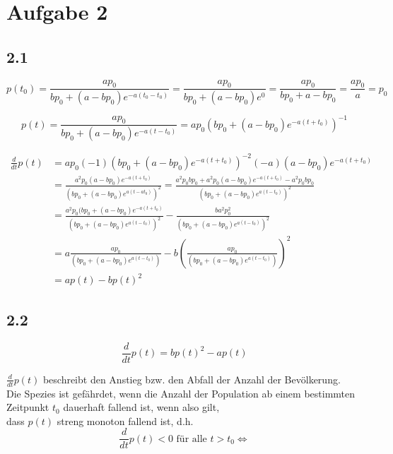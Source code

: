 \documentclass[10pt,oneside,a4paper]{scrartcl}
\begin{document}
	\section*{Aufgabe 2}

	\subsection*{2.1}

	\begin{equation*}	
		p(t_{0}) =\frac {ap_0} {bp_0+ (a-bp_0)e^{-a(t_{0}-t_0)} } = 
				\frac {ap_0} {bp_0+ (a-bp_0)e^0 } = 
				\frac {ap_0} {bp_0+ a-bp_0} =
				\frac {ap_0} {a } = p_0 
	\end{equation*}

	\begin{equation*}
		p(t)  =\frac {ap_0} {bp_0+ (a-bp_0)e^{-a(t-t_0)} } =
			 ap_{0} (bp_0+ (a-bp_0)e^{-a(t + t_0) })^{-1} 
	\end{equation*}

	\begin{align*}
		\frac{d}{dt}p(t) & =
			 ap_{0}(-1) (bp_0+( a -bp_0)e^{-a(t + t_0) })^{-2}
			 (- a)(a-bp_0)e^{-a(t + t_0) }\\
			 & =\frac {a^{2}p_0(a-bp_0)e^{-a(t + t_0)}} {(bp_0+( a -bp_0)e^{a(t 				- at_0) })^{2}}
			 =\frac {a^{2}p_0bp_0 + a^{2}p_0(a-bp_0)e^{-a(t + t_0)} - 		 			a^{2}p_0bp_0} {(bp_0+( a -bp_0)e^{a(t- t_0) })^{2}}\\
			& = \frac {a^{2}p_0(bp_0 + (a-bp_0)e^{-a(t + t_0)}}
			 {(bp_0+( a -bp_0)e^{a(t- t_0) })^{2}} - 
				\frac {ba^{2}p_{0}^2} {(bp_0+( a -bp_0)e^{a(t- t_0) })^{2}}\\
			& =a \frac {ap_0} {(bp_0+( a -bp_0)e^{a(t- t_0) })} - 
				b\left(\frac {ap_{0}} {(bp_0+( a -bp_0)e^{a(t- t_0) })}\right)^2\\
			& = ap(t)-bp(t)^2
	\end{align*}

	\subsection*{2.2}

	\begin{equation*}
		\frac{d}{dt}p(t) = bp(t)^2- ap(t)
	\end{equation*}

	$ \frac{d}{dt}p(t) $ beschreibt den Anstieg bzw. den Abfall der Anzahl der Bevölkerung.\\
	Die Spezies ist gefährdet, wenn die Anzahl der Population ab einem bestimmten Zeitpunkt $ t_0 $ dauerhaft fallend ist, wenn also gilt,\\
	dass $ p(t) $ streng monoton fallend ist, d.h.
		\begin{equation*}
			\frac{d}{dt}p(t) < 0 \text{ für alle } t>t_0\Leftrightarrow
		\end{equation*}
\end{document}
